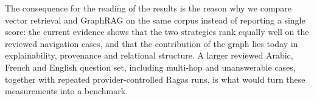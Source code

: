 The consequence for the reading of the results is the reason why we compare vector retrieval and GraphRAG on the same corpus instead of reporting a single score: the current evidence shows that the two strategies rank equally well on the reviewed navigation cases, and that the contribution of the graph lies today in explainability, provenance and relational structure. A larger reviewed Arabic, French and English question set, including multi-hop and unanswerable cases, together with repeated provider-controlled Ragas runs, is what would turn these measurements into a benchmark.

